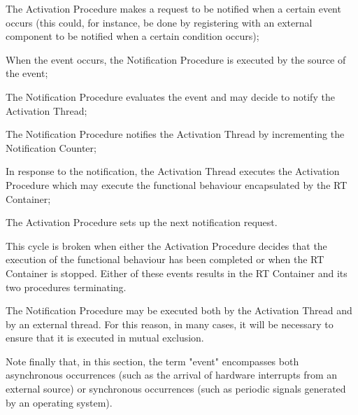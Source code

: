 \begin{fw_enumerate}
\item The Activation Procedure makes a request to be notified when a certain event occurs
(this could, for instance, be done by registering with an external component to be
notified when a certain condition occurs);
\item When the event occurs, the Notification Procedure is executed by the source of the
event;
\item The Notification Procedure evaluates the event and may decide to notify the
Activation Thread;
\item The Notification Procedure notifies the Activation Thread by incrementing the Notification Counter;
\item In response to the notification, the Activation Thread executes the Activation Procedure which may execute the
functional behaviour encapsulated by the RT Container;
\item The Activation Procedure sets up the next notification request.

\end{fw_enumerate}

This cycle is broken when either the Activation Procedure decides that the execution of the
functional behaviour has been completed or when the RT Container is stopped. Either of these
events results in the RT Container and its two procedures terminating.

The Notification Procedure may be executed both by the Activation Thread and by an external thread. For this reason, in many cases, it will be necessary to ensure that it is executed in mutual exclusion.

Note finally that, in this section, the term "event" encompasses both asynchronous occurrences (such as the arrival of hardware interrupts from an external source) or synchronous occurrences (such as periodic signals generated by an operating system). 